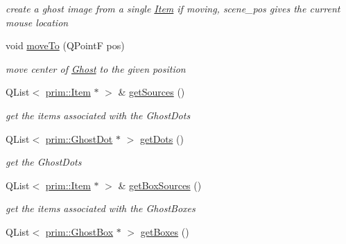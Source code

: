 \begin{DoxyCompactItemize}
\begin{DoxyCompactList}\small\item\em create a ghost image from a single \hyperlink{classprim_1_1Item}{Item} if moving, scene\+\_\+pos gives the current mouse location \end{DoxyCompactList}\item 
void \hyperlink{classprim_1_1Ghost_a1f51f724ed50b9a152ce590e5fc865bd}{move\+To} (Q\+PointF pos)\hypertarget{classprim_1_1Ghost_a1f51f724ed50b9a152ce590e5fc865bd}{}\label{classprim_1_1Ghost_a1f51f724ed50b9a152ce590e5fc865bd}

\begin{DoxyCompactList}\small\item\em move center of \hyperlink{classprim_1_1Ghost}{Ghost} to the given position \end{DoxyCompactList}\item 
Q\+List$<$ \hyperlink{classprim_1_1Item}{prim\+::\+Item} $\ast$ $>$ \& \hyperlink{classprim_1_1Ghost_ac765bda81aa6c2e1d484cf11b7a53b40}{get\+Sources} ()\hypertarget{classprim_1_1Ghost_ac765bda81aa6c2e1d484cf11b7a53b40}{}\label{classprim_1_1Ghost_ac765bda81aa6c2e1d484cf11b7a53b40}

\begin{DoxyCompactList}\small\item\em get the items associated with the Ghost\+Dots \end{DoxyCompactList}\item 
Q\+List$<$ \hyperlink{classprim_1_1GhostDot}{prim\+::\+Ghost\+Dot} $\ast$ $>$ \hyperlink{classprim_1_1Ghost_a6046201ee3e54a1ff5f8ce06e4076034}{get\+Dots} ()\hypertarget{classprim_1_1Ghost_a6046201ee3e54a1ff5f8ce06e4076034}{}\label{classprim_1_1Ghost_a6046201ee3e54a1ff5f8ce06e4076034}

\begin{DoxyCompactList}\small\item\em get the Ghost\+Dots \end{DoxyCompactList}\item 
Q\+List$<$ \hyperlink{classprim_1_1Item}{prim\+::\+Item} $\ast$ $>$ \& \hyperlink{classprim_1_1Ghost_a8588e78ab2471a42cec11ed206f12ba8}{get\+Box\+Sources} ()\hypertarget{classprim_1_1Ghost_a8588e78ab2471a42cec11ed206f12ba8}{}\label{classprim_1_1Ghost_a8588e78ab2471a42cec11ed206f12ba8}

\begin{DoxyCompactList}\small\item\em get the items associated with the Ghost\+Boxes \end{DoxyCompactList}\item 
Q\+List$<$ \hyperlink{classprim_1_1GhostBox}{prim\+::\+Ghost\+Box} $\ast$ $>$ \hyperlink{classprim_1_1Ghost_a3ab6cb77d198a866c036253278778f49}{get\+Boxes} ()\hypertarget{classprim_1_1Ghost_a3ab6cb77d198a866c036253278778f49}{}\label{classprim_1_1Ghost_a3ab6cb77d198a866c036253278778f49}


\end{DoxyCompactItemize}
